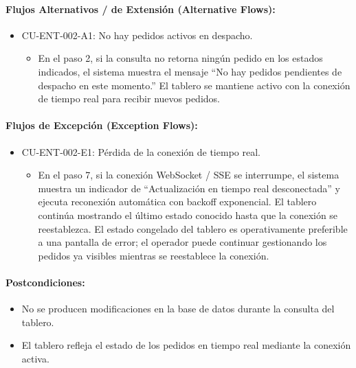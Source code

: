 \paragraph{Flujos Alternativos / de Extensión (Alternative Flows):}
\begin{itemize}
    \item CU-ENT-002-A1: No hay pedidos activos en despacho.
    \begin{itemize}
        \item En el paso 2, si la consulta no retorna ningún pedido en los estados indicados, el sistema muestra el mensaje ``No hay pedidos pendientes de despacho en este momento.'' El tablero se mantiene activo con la conexión de tiempo real para recibir nuevos pedidos.
    \end{itemize}
\end{itemize}

\paragraph{Flujos de Excepción (Exception Flows):}
\begin{itemize}
    \item CU-ENT-002-E1: Pérdida de la conexión de tiempo real.
    \begin{itemize}
        \item En el paso 7, si la conexión WebSocket / SSE se interrumpe, el sistema muestra un indicador de ``Actualización en tiempo real desconectada'' y ejecuta reconexión automática con backoff exponencial. El tablero continúa mostrando el último estado conocido hasta que la conexión se reestablezca. El estado congelado del tablero es operativamente preferible a una pantalla de error; el operador puede continuar gestionando los pedidos ya visibles mientras se reestablece la conexión.
    \end{itemize}
\end{itemize}

\paragraph{Postcondiciones:}
\begin{itemize}
    \item No se producen modificaciones en la base de datos durante la consulta del tablero.
    \item El tablero refleja el estado de los pedidos en tiempo real mediante la conexión activa.
\end{itemize}

